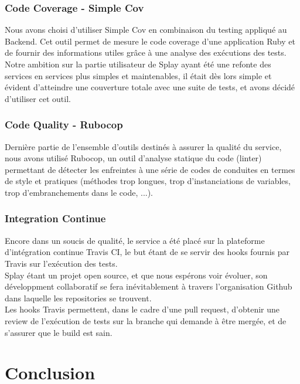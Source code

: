 \documentclass{eplmastersthesis}
\begin{document}
      \subsection{Code Coverage - Simple Cov}

        Nous avons choisi d'utiliser Simple Cov en combinaison du testing appliqué
        au Backend. Cet outil permet de mesure le code coverage d'une application
        Ruby et de fournir des informations utiles grâce à une analyse des
        exécutions des tests.\\

        Notre ambition sur la partie utilisateur de Splay ayant été une refonte
        des services en services plus simples et maintenables, il était dès lors
        simple et évident d'atteindre une couverture totale avec une suite de tests,
        et avons décidé d'utiliser cet outil.

      \subsection{Code Quality - Rubocop}

        Dernière partie de l'ensemble d'outils destinés à assurer la qualité du
        service, nous avons utilisé Rubocop, un outil d'analyse statique du code
        (linter) permettant de détecter les enfreintes à une série de codes
        de conduites en termes de style et pratiques (méthodes trop longues,
        trop d'instanciations de variables, trop d'embranchements dans le code, ...).

      \subsection{Integration Continue}

        Encore dans un soucis de qualité, le service a été placé sur la plateforme
        d'intégration continue Travis CI, le but étant de se servir des hooks
        fournis par Travis sur l'exécution des tests.\\

        Splay étant un projet open source, et que nous espérons voir évoluer, son
        développment collaboratif se fera inévitablement à travers l'organisation
        Github dans laquelle les repositories se trouvent.\\
        Les hooks Travis permettent, dans le cadre d'une pull request, d'obtenir
        une review de l'exécution de tests sur la branche qui demande à être
        mergée, et de s'assurer que le build est sain.


  \chapter{Conclusion}

  \nocite{*}
  
  




  \backcoverpage
\end{document}
